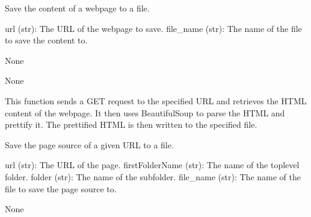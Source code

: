\documentclass[letterpaper,10pt,english]{sphinxmanual}
\begin{document}

\begin{fulllineitems}
\label{\detokenize{Project.Script:Project.Script.RecupKbPaloAlto.save_knowledge_base}}
\pysigstartsignatures
{}
\pysigstopsignatures
\sphinxAtStartPar
Save the content of a webpage to a file.
\begin{description}
\sphinxAtStartPar
url (str): The URL of the webpage to save.
file\_name (str): The name of the file to save the content to.

\sphinxAtStartPar
None

\sphinxAtStartPar
None

\end{description}

\sphinxAtStartPar
This function sends a GET request to the specified URL and retrieves the HTML content of the webpage.
It then uses BeautifulSoup to parse the HTML and prettify it. The prettified HTML is then written to the specified file.

\end{fulllineitems}


\begin{fulllineitems}
\label{\detokenize{Project.Script:Project.Script.RecupKbPaloAlto.save_page_source}}
\pysigstartsignatures
{}
\pysigstopsignatures
\sphinxAtStartPar
Save the page source of a given URL to a file.
\begin{description}
\sphinxAtStartPar
url (str): The URL of the page.
firstFolderName (str): The name of the top\sphinxhyphen{}level folder.
folder (str): The name of the subfolder.
file\_name (str): The name of the file to save the page source to.

\sphinxAtStartPar
None

\end{description}

\end{fulllineitems}
\end{document}
